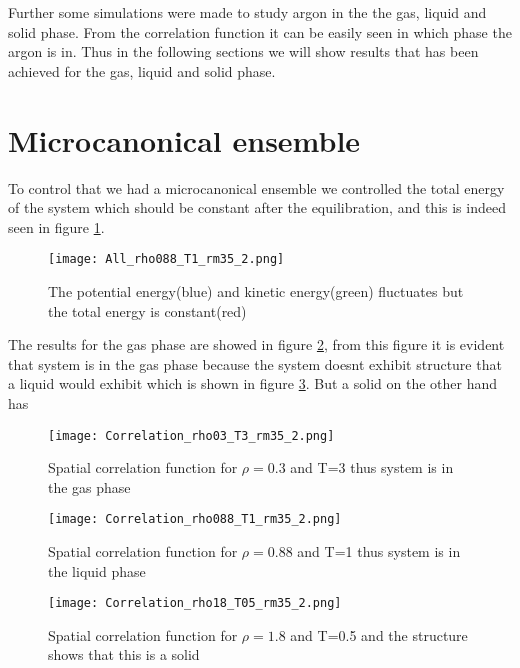 \documentclass[12pt,a4paper]{report}
\begin{document}
Further some simulations were made to study argon in the the gas, liquid and solid phase. From the correlation function it can be easily seen in which phase the argon is  in. Thus in the following sections we will show results that has been achieved for the gas, liquid and solid phase.

\section{Microcanonical ensemble}

To control that we had a microcanonical ensemble we controlled the total energy of the system which should be constant after the equilibration, and this is indeed seen in figure \ref{fig:all_rho}.

\begin{figure}[H]
\centering
\texttt{[image: All\_rho088\_T1\_rm35\_2.png]}
\caption{The potential energy(blue) and kinetic energy(green) fluctuates but the total energy is constant(red) }
\label{fig:all_rho}
\end{figure}

The results for the gas phase are showed in figure \ref{fig:gas_cor}, from this figure it is evident that system is in the gas phase because the system doesnt exhibit structure that a liquid would exhibit which is shown in figure \ref{fig:liq_cor}. But a solid on the other hand has

\begin{figure}[H]
\centering
\texttt{[image: Correlation\_rho03\_T3\_rm35\_2.png]}
\caption{Spatial correlation function for $\rho =0.3$ and T=3 thus system is in the gas phase}
\label{fig:gas_cor}
\end{figure}

\begin{figure}[H]
\centering
\texttt{[image: Correlation\_rho088\_T1\_rm35\_2.png]}
\caption{Spatial correlation function for $\rho =0.88$ and T=1 thus system is in the liquid phase}
\label{fig:liq_cor}
\end{figure}

\begin{figure}[H]
\centering
\texttt{[image: Correlation\_rho18\_T05\_rm35\_2.png]}
\caption{Spatial correlation function for $\rho =1.8$ and T=0.5 and the structure shows that this is a solid}
\label{fig:solid_cor}
\end{figure}
\end{document}
